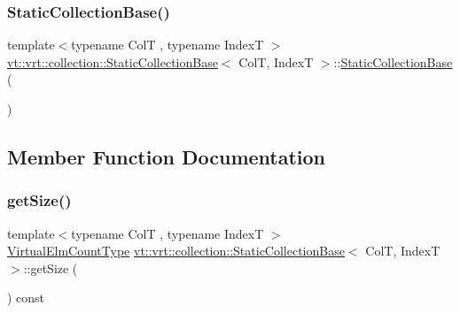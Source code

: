 \mbox{\label{structvt_1_1vrt_1_1collection_1_1_static_collection_base_ae304da84e3f97d1349cf9892e759efc7}} 
\subsubsection{\texorpdfstring{Static\+Collection\+Base()}{StaticCollectionBase()}\hspace{0.1cm}{\footnotesize\ttfamily [2/2]}}
{\footnotesize\ttfamily template$<$typename ColT , typename IndexT $>$ \\
\hyperlink{structvt_1_1vrt_1_1collection_1_1_static_collection_base}{vt\+::vrt\+::collection\+::\+Static\+Collection\+Base}$<$ ColT, IndexT $>$\+::\hyperlink{structvt_1_1vrt_1_1collection_1_1_static_collection_base}{Static\+Collection\+Base} (\begin{DoxyParamCaption}{ }\end{DoxyParamCaption})}



\subsection{Member Function Documentation}
\mbox{\label{structvt_1_1vrt_1_1collection_1_1_static_collection_base_ac2858ef1bc952a6caf8fb299199aa703}} 
\subsubsection{\texorpdfstring{get\+Size()}{getSize()}}
{\footnotesize\ttfamily template$<$typename ColT , typename IndexT $>$ \\
\hyperlink{namespacevt_ac115668758184050beff7a9281a2c490}{Virtual\+Elm\+Count\+Type} \hyperlink{structvt_1_1vrt_1_1collection_1_1_static_collection_base}{vt\+::vrt\+::collection\+::\+Static\+Collection\+Base}$<$ ColT, IndexT $>$\+::get\+Size (\begin{DoxyParamCaption}{ }\end{DoxyParamCaption}) const}

